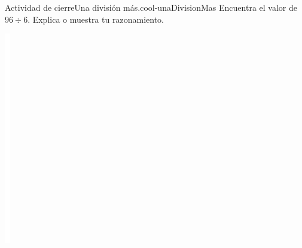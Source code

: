 \documentclass[14pt]{extarticle}
\begin{document}
\begin{project}{Actividad de cierre}{Una división más.}{cool-unaDivisionMas}%
Encuentra el valor de \(96 \div 6\). Explica o muestra tu razonamiento.%
\begin{image}{0}{1}{0}{}%
\includegraphics[max width=\linewidth, center]{external/whitespace-tikz/6cm.pdf}
\end{image}%
\end{project}
\end{document}

